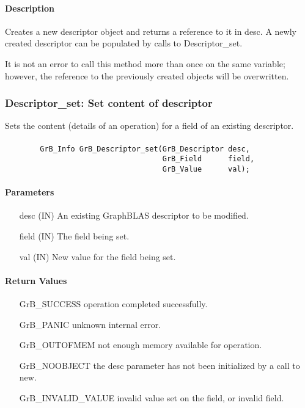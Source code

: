 \paragraph{Description}

Creates a new descriptor object and returns a reference to it in {\sf desc}.
A newly created descriptor can be populated by calls to {\sf Descriptor\_set}.

It is not an error to call this method more than once on the same variable;  
however, the reference to the previously created objects will be overwritten. 


\subsubsection{{\sf Descriptor\_set}: Set content of descriptor}

Sets the content (details of an operation) for a field of an existing
descriptor.

\paragraph{\syntax}

\begin{verbatim}
        GrB_Info GrB_Descriptor_set(GrB_Descriptor desc,
                                    GrB_Field      field,
                                    GrB_Value      val);
\end{verbatim}

\paragraph{Parameters}

\begin{itemize}[leftmargin=1.1in]
    \item[{\sf desc}]  ({\sf IN}) An existing GraphBLAS descriptor to be modified.
    \item[{\sf field}] ({\sf IN}) The field being set.
    \item[{\sf val}]   ({\sf IN}) New value for the field being set.
\end{itemize}

\paragraph{Return Values}

\begin{itemize}[leftmargin=2.1in]
\item[{\sf GrB\_SUCCESS}]           operation completed successfully.
\item[{\sf GrB\_PANIC}]             unknown internal error.
\item[{\sf GrB\_OUTOFMEM}]          not enough memory available for operation.
\item[{\sf GrB\_NOOBJECT}]          the {\sf desc} parameter has not been
                                    initialized by a call to {\sf new}.
\item[{\sf GrB\_INVALID\_VALUE}]    invalid value set on the field, or invalid field.
\end{itemize}

